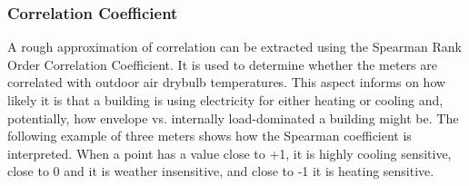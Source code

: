 \subsubsection{Correlation Coefficient}
\label{sec:weathercorrelationcoeff}

A rough approximation of correlation can be extracted using the Spearman Rank Order Correlation Coefficient. It is used to determine whether the meters are correlated with outdoor air drybulb temperatures. This aspect informs on how likely it is that a building is using electricity for either heating or cooling and, potentially, how envelope vs. internally load-dominated a building might be. The following example of three meters shows how the Spearman coefficient is interpreted. When a point has a value close to +1, it is highly cooling sensitive, close to 0 and it is weather insensitive, and close to -1 it is heating sensitive.